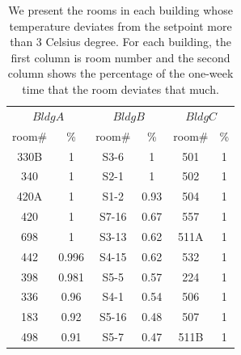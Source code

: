 \begin{table}[h!]
 \begin{center}
	\begin{tabular}{|c|c|c|c|c|c|}
	\multicolumn{2}{c}{$Bldg A$}
	 & \multicolumn{2}{c}{$Bldg B$}
	  & \multicolumn{2}{c}{$Bldg C$} \\
	\cline{1-6} 
	 room\# & \% & room# & \% & room\# & \%\\
	\cline{1-6}
	 330B & 1 & S3-6 & 1 & 501 & 1\\
	\cline{1-6}
	 340 & 1 & S2-1 & 1 & 502 & 1\\
	\cline{1-6}
	420A & 1 & S1-2 & 0.93 & 504 & 1\\
	\cline{1-6}
	420 & 1 & S7-16 & 0.67 & 557 & 1\\
	\cline{1-6}
	698 & 1 & S3-13 & 0.62 & 511A & 1\\
	\cline{1-6}
	442 & 0.996 & S4-15 & 0.62 & 532 & 1\\
	\cline{1-6}
	398 & 0.981 & S5-5 & 0.57 & 224 & 1\\
	\cline{1-6}
	336 & 0.96 & S4-1 & 0.54 & 506 & 1\\
	\cline{1-6}
	183 & 0.92 & S5-16 & 0.48 & 507 & 1\\
	\cline{1-6}
	498 & 0.91 & S5-7 & 0.47 & 511B & 1\\
	\cline{1-6}

	\end{tabular}
 \end{center}
 \caption{We present the rooms in each building whose temperature deviates from the setpoint more than 3 Celsius degree. For each building, the first column is room number and the second column shows the percentage of the one-week time that the room deviates that much.}
 \label{tab:cluster}
\end{table}
